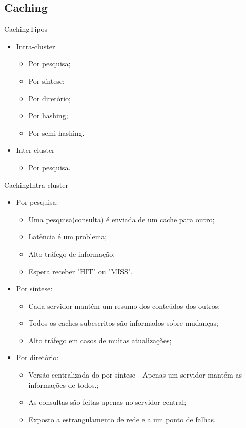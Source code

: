 \documentclass{beamer}
\begin{document}
\subsection{Caching}

\begin{frame}{Caching}{Tipos}
\begin{itemize}
\item Intra-cluster
\begin{itemize}
\item Por pesquisa;
\item Por s\'intese;
\item Por diret\'orio;
\item Por hashing;
\item Por semi-hashing.
\end{itemize}
\item Inter-cluster
\begin{itemize}
\item Por pesquisa.
\end{itemize}
\end{itemize}
\end{frame}

\begin{frame}{Caching}{Intra-cluster}
\begin{itemize}
\item Por pesquisa:
\begin{itemize}
\item Uma pesquisa(consulta) \'e enviada de um cache para outro;
\item Lat\^encia \'e um problema;
\item Alto tr\'afego de informa\c{c}\~ao;
\item Espera receber "HIT" ou "MISS".
\end{itemize}
\item Por s\'intese:
\begin{itemize}
\item Cada servidor mant\'em um resumo dos conte\'udos dos outros;
\item Todos os caches subescritos s\~ao informados sobre mudan\c{c}as;
\item Alto tr\'afego em casos de muitas atualiza\c{c}\~oes;
\end{itemize}
\item Por diret\'orio:
\begin{itemize}
\item Vers\~ao centralizada do por s\'intese - Apenas um servidor mant\'em as informa\c{c}\~oes de todos.;
\item As consultas s\~ao feitas apenas no servidor central;
\item Exposto a estrangulamento de rede e a um ponto de falhas.
\end{itemize}
\end{itemize}
\end{frame}
\end{document}
